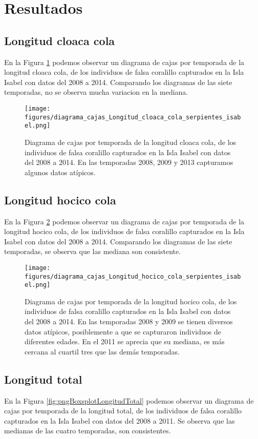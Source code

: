 \documentclass{article}
\begin{document}
\section*{Resultados}

\subsection*{Longitud cloaca cola}
En la Figura \ref{fig:pngBoxsplotLongitudCloacaCola} podemos observar un diagrama de cajas por
temporada de la longitud cloaca cola, de los individuos de falsa coralillo capturados en la Isla
Isabel con datos del 2008 a 2014. Comparando los diagramas de las siete temporadas, no se observa
mucha variacion en la mediana.

\begin{figure}[H]
\centering
\caption{Diagrama de cajas por temporada de la longitud cloaca cola, de los individuos de falsa coralillo capturados en la Isla Isabel con datos del 2008 a 2014. En las temporadas 2008, 2009 y 2013 capturamos algunos datos atípicos.}
\label{fig:pngBoxsplotLongitudCloacaCola}
\texttt{[image: figures/diagrama\_cajas\_Longitud\_cloaca\_cola\_serpientes\_isabel.png]}
\end{figure}

\subsection*{Longitud hocico cola}
En la Figura \ref{fig:pngBoxsplotLongitudHocicoCola} podemos observar un diagrama de cajas por
temporada de la longitud hocico cola, de los individuos de falsa coralillo capturados en la Isla
Isabel con datos del 2008 a 2014. Comparando los diagramas de las siete temporadas, se observa  que
las mediana son consistente.

\begin{figure}[H]
\centering
\caption{Diagrama de cajas por temporada de la longitud hocico cola, de los individuos de falsa coralillo capturados en la Isla Isabel con datos del 2008 a 2014. En las temporadas 2008 y 2009 se tienen diversos datos atípicos, posiblemente a que se capturaron individuos de diferentes edades. En el 2011 se aprecia que su mediana, es más cercana al cuartil tres que las demás temporadas.}
\label{fig:pngBoxsplotLongitudHocicoCola}
\texttt{[image: figures/diagrama\_cajas\_Longitud\_hocico\_cola\_serpientes\_isabel.png]}
\end{figure}

\subsection*{Longitud total}
En la Figura \ref{fig:pngBoxsplotLongitudTotal} podemos observar un diagrama de cajas por
temporada de la longitud total, de los individuos de falsa coralillo capturados en la Isla
Isabel con datos del 2008 a 2011. Se observa que las medianas de las cuatro temporadas, son consistentes.
\end{document}
